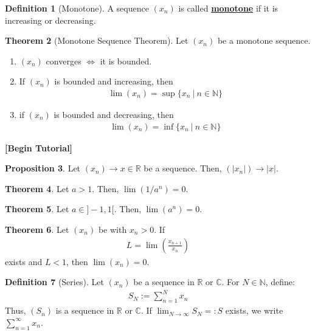 \documentclass[reqno,11pt]{amsart}
\theoremstyle{definition}
\newtheorem{theorem}{Theorem}
\newtheorem{prop}[theorem]{Proposition}
\theoremstyle{definition}
\newtheorem{definition}[theorem]{Definition}
\theoremstyle{remark}
\newcommand{\C}{\mathbb{C}}
\newcommand{\R}{\mathbb{R}}
\newcommand{\N}{\mathbb{N}}
\newcommand{\dfn}[1]{\underline{\textbf{#1}}}
\begin{document}
\begin{definition}[Monotone]
	A sequence $(x_n)$ is called \dfn{monotone} if it is increasing or decreasing.
\end{definition}

\begin{theorem}[Monotone Sequence Theorem]
	Let $(x_n)$ be a monotone sequence. 
	\begin{enumerate}[noitemsep]
		\item $(x_n)$ converges $\iff$ it is bounded. 
		\item If $(x_n)$ is bounded and increasing, then
		\begin{align}
			\lim (x_n) = \sup \{ x_n\ |\ n \in \N \} 	
		\end{align}
		\item if $(x_n)$ is bounded and decreasing, then
		\begin{align}
			\lim(x_n) = \inf \{ x_n\ |\ n \in \N \} 	
		\end{align}

	\end{enumerate}
\end{theorem}

\begin{center}
	\textbf{[Begin Tutorial]}
\end{center}
\begin{prop}
	Let $(x_n) \rightarrow x \in \R$ be a sequence. Then, $(|x_n|) \rightarrow |x|$.
\end{prop}
\begin{theorem}
	Let $a>1$. Then, $\lim (1/a^n) = 0$.
\end{theorem}
\begin{theorem}
	Let $a \in ]-1, 1[$. Then, $\lim(a^n) =0$.
\end{theorem}

\begin{theorem}
	Let $(x_n)$ be with $x_n > 0$. If
	\begin{align}
		L = \lim \left( \frac{x_{n+1}}{x_n} \right) 	
	\end{align}
	exists and $L<1$, then $\lim (x_n) = 0$.
\end{theorem}

\begin{definition}[Series]
	Let $(x_n)$ be a sequence in $\R$ or $\C$. For $N \in \N$, define:
	\begin{align}
		S_N := \sum_{n=1}^N x_n 	
	\end{align}
	Thus, $(S_n)$ is a sequence in $\R$ or $\C$. If $\lim_{N \rightarrow \infty} S_N =: S$ exists, we write $\sum_{n=1}^\infty x_n$.
\end{definition}
\end{document}
